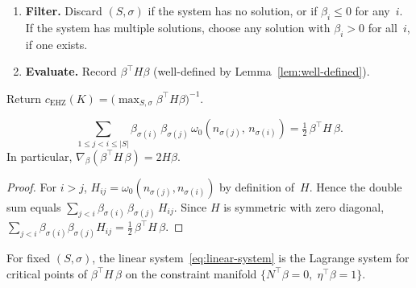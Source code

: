 \begin{algorithm*}
\begin{enumerate}
\item \textbf{Filter.}
  Discard $(S, \sigma)$ if the system has no solution, or
  if $\beta_i \leq 0$ for any~$i$.
  If the system has multiple solutions, choose any solution
  with $\beta_i > 0$ for all~$i$, if one exists.

\item \textbf{Evaluate.}
  Record $\beta^\top H \beta$
  (well-defined by Lemma~\ref{lem:well-defined}).
\end{enumerate}

\noindent
Return
$c_{\mathrm{EHZ}}(K) = \bigl(\max_{S,\sigma} \beta^\top H \beta\bigr)^{-1}$.
\end{algorithm*}

\medskip

\begin{lemma}\label{lem:H-quadratic}
\[
  \sum_{1 \leq j < i \leq |S|}
    \beta_{\sigma(i)}\, \beta_{\sigma(j)}\,
    \omega_0(n_{\sigma(j)},\, n_{\sigma(i)})
  = \tfrac{1}{2}\, \beta^\top H\, \beta.
\]
In particular,
$\nabla_{\beta}
  (\beta^\top H\, \beta) = 2H \beta$.
\end{lemma}

\begin{proof}
For $i > j$,
$H_{ij} = \omega_0(n_{\sigma(j)}, n_{\sigma(i)})$
by definition of~$H$.
Hence the double sum equals
$\sum_{j < i} \beta_{\sigma(i)}\, \beta_{\sigma(j)}\, H_{ij}$.
Since $H$ is symmetric with zero diagonal,
$\sum_{j < i} \beta_{\sigma(i)} \beta_{\sigma(j)} H_{ij}
= \tfrac{1}{2}\, \beta^\top H\, \beta$.
\end{proof}

\begin{lemma}%
\label{lem:kkt}
For fixed $(S, \sigma)$, the linear
system~\eqref{eq:linear-system} is the Lagrange system for
critical points of
$\beta^\top H\, \beta$ on the constraint
manifold
$\{N^\top \beta = 0,\; \eta^\top \beta = 1\}$.
\end{lemma}

